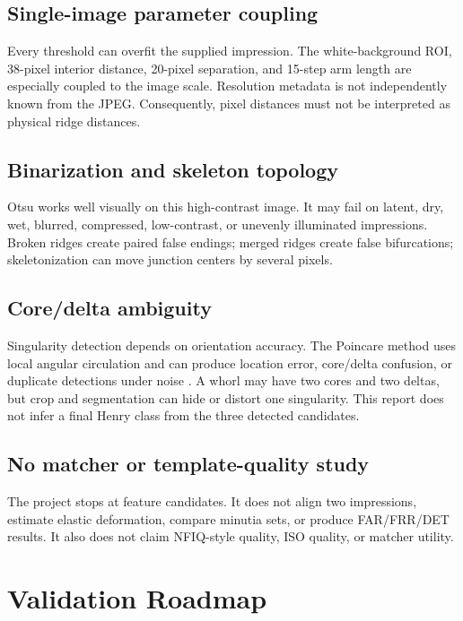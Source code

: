 \documentclass[11pt]{article}
\begin{document}
\subsection{Single-image parameter coupling}

Every threshold can overfit the supplied impression. The white-background ROI, 38-pixel interior distance, 20-pixel separation, and 15-step arm length are especially coupled to the image scale. Resolution metadata is not independently known from the JPEG. Consequently, pixel distances must not be interpreted as physical ridge distances.

\subsection{Binarization and skeleton topology}

Otsu works well visually on this high-contrast image. It may fail on latent, dry, wet, blurred, compressed, low-contrast, or unevenly illuminated impressions. Broken ridges create paired false endings; merged ridges create false bifurcations; skeletonization can move junction centers by several pixels.

\subsection{Core/delta ambiguity}

Singularity detection depends on orientation accuracy. The Poincare method uses local angular circulation and can produce location error, core/delta confusion, or duplicate detections under noise \cite{ohtsuka2007core}. A whorl may have two cores and two deltas, but crop and segmentation can hide or distort one singularity. This report does not infer a final Henry class from the three detected candidates.

\subsection{No matcher or template-quality study}

The project stops at feature candidates. It does not align two impressions, estimate elastic deformation, compare minutia sets, or produce FAR/FRR/DET results. It also does not claim NFIQ-style quality, ISO quality, or matcher utility.

\section{Validation Roadmap}
\end{document}
